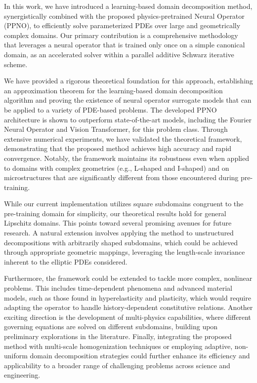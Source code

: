 \documentclass[preprint,11pt]{elsarticle}
\theoremstyle{plain}
\begin{document}
In this work, we have introduced a learning-based domain decomposition method, synergistically combined with the proposed physics-pretrained Neural Operator (PPNO), to efficiently solve parameterized PDEs over large and geometrically complex domains. Our primary contribution is a comprehensive methodology that leverages a neural operator that is trained only once on a simple canonical domain, as an accelerated solver within a parallel additive Schwarz iterative scheme.

We have provided a rigorous theoretical foundation for this approach, establishing an approximation theorem for the learning-based domain decomposition algorithm and proving the existence of neural operator surrogate models that can be applied to a variety of PDE-based problems. The developed PPNO architecture is shown to outperform state-of-the-art models, including the Fourier Neural Operator and Vision Transformer, for this problem class. Through extensive numerical experiments, we have validated the theoretical framework, demonstrating that the proposed method achieves high accuracy and rapid convergence. Notably, the framework maintains its robustness even when applied to domains with complex geometries (e.g., L-shaped and I-shaped) and on microstructures that are significantly different from those encountered during pre-training.

While our current implementation utilizes square subdomains congruent to the pre-training domain for simplicity, our theoretical results hold for general Lipschitz domains. This points toward several promising avenues for future research. A natural extension involves applying the method to unstructured decompositions with arbitrarily shaped subdomains, which could be achieved through appropriate geometric mappings, leveraging the length-scale invariance inherent to the elliptic PDEs considered.

Furthermore, the framework could be extended to tackle more complex, nonlinear problems. This includes time-dependent phenomena and advanced material models, such as those found in hyperelasticity and plasticity, which would require adapting the operator to handle history-dependent constitutive relations. Another exciting direction is the development of multi-physics capabilities, where different governing equations are solved on different subdomains, building upon preliminary explorations in the literature. Finally, integrating the proposed method with multi-scale homogenization techniques or employing adaptive, non-uniform domain decomposition strategies could further enhance its efficiency and applicability to a broader range of challenging problems across science and engineering.
\end{document}
